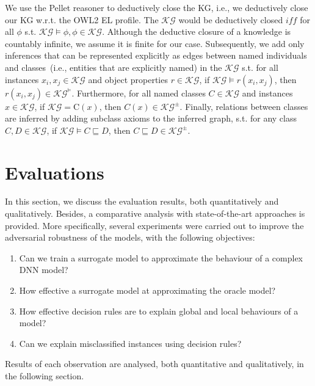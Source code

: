 \hspace*{3.5mm} We use the Pellet reasoner to deductively close the KG, i.e., we deductively close our KG w.r.t. the OWL2 EL profile. The $\mathcal{KG}$ would be deductively closed $iff$ for all $\phi$ s.t. $\mathcal{KG} \models \phi, \phi \in \mathcal{KG}$. Although the deductive closure of a knowledge is countably infinite, we assume it is finite for our case. Subsequently, we add only inferences that can be represented explicitly as edges between named individuals and classes~(i.e., entities that are explicitly named) in the $\mathcal{KG}$ s.t. for all instances $x_{i}, x_{j} \in \mathcal{KG}$ and object properties $r \in \mathcal{KG}$, if $\mathcal{KG} \models r\left(x_{i}, x_{j}\right)$, then $r\left(x_{i}, x_{j}\right) \in \mathcal{KG} ^{\models}$. Furthermore, for all named classes $C \in \mathcal{KG}$ and instances $x \in \mathcal{KG}$, if $\mathcal{KG}=\mathrm{C}(x)$, then $C(x) \in \mathcal{KG} ^{\pm}$. Finally, relations between classes are inferred by adding subclass axioms to the inferred graph, s.t. for any class $C, D \in \mathcal{KG}$, if $\mathcal{KG} \models C \sqsubseteq D$, then $C \sqsubseteq D \in \mathcal{KG}^{\pm}$. 

\section{Evaluations}\label{chapter_8:results}
In this section, we discuss the evaluation results, both quantitatively and qualitatively. Besides, a comparative analysis with state-of-the-art approaches is provided. More specifically, several experiments were carried out to improve the adversarial robustness of the models, with the following objectives:

\begin{enumerate}[noitemsep]
    \item Can we train a surrogate model to approximate the behaviour of a complex DNN model? 
    \item How effective a surrogate model at approximating the oracle model?  
    \item How effective decision rules are to explain global and local behaviours of a model?   
    \item Can we explain misclassified instances using decision rules? 
\end{enumerate}

\hspace*{3.5mm} Results of each observation are analysed, both quantitative and qualitatively, in the following section.

